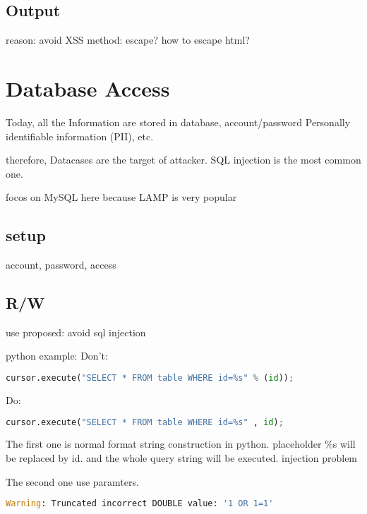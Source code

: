 \documentclass[12pt, a4paper]{article}
\begin{document}
\subsection{Output}
reason: avoid XSS
method: escape?
how to escape html?


%   
\section{Database Access}
Today,
all the Information are stored in database,
account/password
Personally identifiable information (PII),
etc.

therefore,
Datacases are the target of attacker.
SQL injection is the most common one.

focos on MySQL here because LAMP is very popular

\subsection{setup}
account, password, access

\subsection{R/W}
use proposed: avoid sql injection

python example:
Don't:
\begin{lstlisting}[language=python]
cursor.execute("SELECT * FROM table WHERE id=%s" % (id));
\end{lstlisting}
Do:
\begin{lstlisting}[language=python]
cursor.execute("SELECT * FROM table WHERE id=%s" , id);
\end{lstlisting}
The first one is normal format string construction in python.
placeholder \%s will be replaced by id.
and the whole query string will be executed.
injection problem

The second one use paramters.
\begin{lstlisting}[language=python]
Warning: Truncated incorrect DOUBLE value: '1 OR 1=1'
\end{lstlisting}
\end{document}
